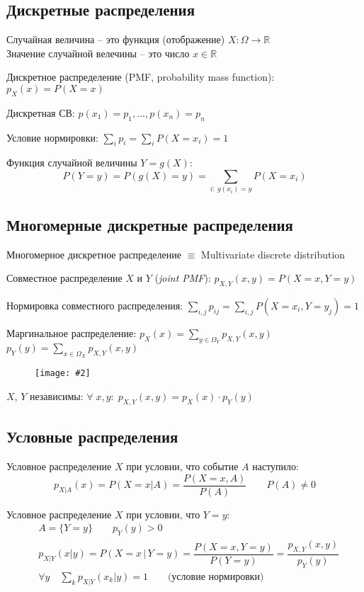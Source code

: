 \documentclass[a4paper,12pt,fleqn]{article}
\numberwithin{figure}{section}
\newcommand\cfigure[2]{
	\begin{figure}[H] \centering \texttt{[image: \#2]} \end{figure}
}
\theoremstyle{definition}
\def\R{\mathbb{R}}
\def\on{\!:}
\begin{document}
\subsection{Дискретные распределения}

Случайная величина -- это функция (отображение) $X\on \Omega\to\R$ \\
Значение случайной велечины -- это число $x\in\R$

Дискретное распределение (PMF, probability mass function): $p_X(x)=P(X=x)$

Дискретная СВ: $p(x_1)=p_1, ..., p(x_n)=p_n$

Условие нормировки: $\sum_i p_i = \sum_i P(X=x_i)=1$

Функция случайной величины $Y=g(X)$:
\[ P(Y=y) = P(g(X)=y) = \sum_{i:\: g(x_i)=y}P(X=x_i) \]


\subsection{Многомерные дискретные распределения}

Многомерное дискретное распределение $\equiv$ Multivariate discrete distribution

Совместное распределение $X$ и $Y$ (\textit{joint PMF}): $p_{X,Y}(x,y)=P(X=x,Y=y)$

Нормировка совместного распределения:
$\sum_{i,j}p_{ij} = \sum_{i,j} P(X=x_i,Y=y_j) = 1$

Маргинальное распределение:
$p_X(x) = \!\!\sum_{y \in \Omega_Y} p_{X,Y}(x,y)$ \quad
$p_Y(y) = \!\!\sum_{x \in \Omega_X} p_{X,Y}(x,y)$
\cfigure{11cm}{marginal-distribs.png}

$X$, $Y$ независимы: $\forall \; x,y: \; p_{X,Y}(x,y)=p_X(x) \cdot p_Y(y)$


\subsection{Условные распределения}

Условное распределение $X$ при условии, что событие $A$ наступило:
\[ p_{X|A}(x)=P(X=x|A)=\dfrac{P(X=x,A)}{P(A)} \qquad P(A) \ne 0 \]

Условное распределение $X$ при условии, что $Y=y$:
\begin{align*}
&	A=\{Y=y\}	\qquad p_Y(y)>0 \\
&	p_{X|Y}(x|y) = P(X=x\,|\,Y=y) = \dfrac{P(X=x,Y=y)}{P(Y=y)} = \dfrac{p_{X,Y}(x,y)}{p_Y(y)} \\
&	\forall y \quad \sum_k p_{X|Y}(x_k|y)=1		\qquad \text{(условие нормировки)}
\end{align*}
\end{document}
